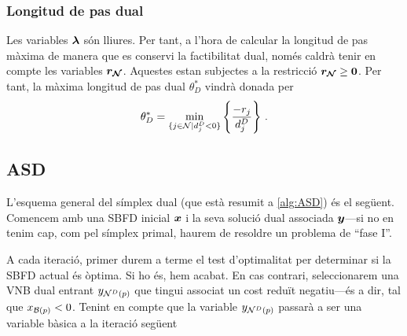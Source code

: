 \subsubsection{Longitud de pas dual}
Les variables $\boldsymbol{\lambda}$ són lliures. Per tant, a l'hora de calcular la longitud de pas màxima de manera que es conservi la factibilitat dual, només caldrà tenir en compte les variables $\boldsymbol{r_{\mathcal{N}}}$. Aquestes estan subjectes a la restricció $\boldsymbol{r_{\mathcal{N}}} \ge \boldsymbol{0}$. Per tant, la màxima longitud de pas dual $\theta^\ast_D$ vindrà donada per
\[
	\theta_D^\ast = \min\limits_{\{j\in \mathcal{N} \mid d^D_j < 0 \}} \left\{\frac{-r_j}{d^D_j}\right\}\,.
\]

\subsection{ASD}

L'esquema general del símplex dual (que està resumit a \ref{alg:ASD}) és el següent. Comencem amb una SBFD inicial $\boldsymbol{x}$ i la seva solució dual associada $\boldsymbol{y}$---si no en tenim cap, com pel símplex primal, haurem de resoldre un problema de ``fase I''. 

A cada iteració, primer durem a terme el test d'optimalitat per determinar si la SBFD actual és òptima. Si ho és, hem acabat. En cas contrari, seleccionarem una VNB dual entrant ${y_{\mathcal{N}^D(p)}}$ que tingui associat un cost reduït negatiu---és a dir, tal que $x_{\mathcal{B}(p)} < 0$. Tenint en compte que la variable $y_{\mathcal{N}^D(p)}$ passarà a ser una variable bàsica a la iteració següent 

